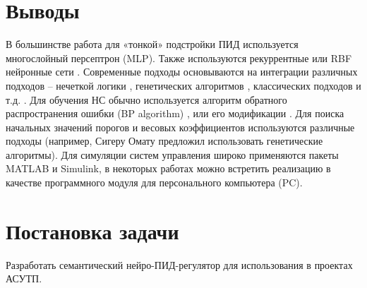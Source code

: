 \section{Выводы}

В большинстве работа для «тонкой» подстройки ПИД используется многослойный персептрон (MLP). Также используются рекуррентные или RBF нейронные сети \cite{Reza2011}. Современные подходы основываются на интеграции различных подходов – нечеткой логики \cite{Tahour2007}, генетических алгоритмов \cite{Sharkawy2006}, классических подходов и т.д. \cite{Omatu_Khalid_Yusof}.
Для обучения НС обычно используется алгоритм обратного распространения ошибки (BP algorithm) \cite{Omatu_Khalid_Yusof}, \cite{Ruano1992ApplicationsON} или его модификации \cite{Han1999}. Для поиска начальных значений порогов и весовых коэффициентов используются различные подходы (например, Сигеру Омату \cite{Omatu_Khalid_Yusof} предложил использовать генетические алгоритмы). Для симуляции систем управления широко применяются пакеты MATLAB и Simulink, в некоторых работах можно встретить реализацию в качестве программного модуля для персонального компьютера (PC).

\section{Постановка задачи}

Разработать семантический нейро-ПИД-регулятор для использования в проектах АСУТП.
